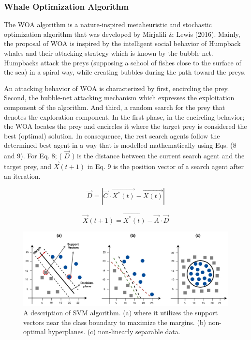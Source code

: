 \subsubsection{Whale Optimization Algorithm}

The WOA algorithm is a nature-inspired metaheuristic and stochastic optimization algorithm that was developed by Mirjalili $\&$ Lewis (2016). Mainly, the proposal of WOA is inspired by the intelligent social behavior of Humpback whales and their attacking strategy which is known by the bubble-net. Humpbacks attack the preys (supposing a school of fishes close to the surface of the sea) in a spiral way, while creating bubbles during the path toward the preys.

An attacking behavior of WOA is characterized by first, encircling the prey. Second, the bubble-net attacking mechanism which expresses the exploitation component of the algorithm. And third, a random search for the prey that denotes the exploration component. In the first phase, in the encircling behavior; the WOA locates the prey and encircles it where the target prey is considered the best (optimal) solution. In consequence, the rest search agents follow the determined best agent in a way that is modelled mathematically using Eqs. (8 and 9). For Eq. 8; ( $\vec{D}$ ) is the distance between the current search agent and the target prey, and $\vec{X}(t+1)$ in Eq. 9 is the position vector of a search agent after an iteration.

\begin{equation}
\vec{D}=|\vec{C}\cdot\vec{X^{*}(t)}-\vec{X(t)}|
\end{equation}

\begin{equation}
\vec{X}(t+1)=\vec{X^{*}(t)}-\vec{A}\cdot\vec{D}
\end{equation}

\begin{figure}[htbp]
\centering
\includegraphics[width=0.8\linewidth]{images/ab40e7534200a28ad0392017099aeeaafed80ecd772ea2abf9eef4ad45a1a838.jpg}
\caption{A description of SVM algorithm. (a) where it utilizes the support vectors near the class boundary to maximize the margins. (b) non-optimal hyperplanes. (c) non-linearly separable data.}
\label{fig:2}
\end{figure}


